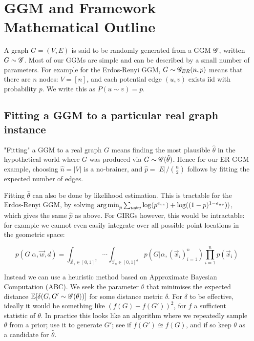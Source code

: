 

\section{GGM and Framework Mathematical Outline}
A graph $G = (V,E)$ is said to be randomly generated from a GGM $\mathscr{G}$, written $G \sim \mathscr{G}$. Most of our GGMs are simple and can be described by a small number of parameters. For example for the Erdos-Renyi GGM, $G \sim \mathscr{G}_{ER}(n, p)$ means that there are $n$ nodes: $V=[n]$, and each potential edge $(u,v)$ exists iid with probability $p$. We write this as $P(u \sim v) = p$.

\subsection{Fitting a GGM to a particular real graph instance}
\label{sec:fitting_GGM}
"Fitting" a GGM to a real graph $G$ means finding the most plausible $\hat{\theta}$ in the hypothetical world where $G$ was produced via $G \sim \mathscr{G}(\hat{\theta})$. Hence for our ER GGM example, choosing $\hat{n} = |V|$ is a no-brainer, and $\hat{p} = |E| / \binom{n}{2}$ follows by fitting the expected number of edges.

Fitting $\hat{\theta}$ can also be done by likelihood estimation. This is tractable for the Erdos-Renyi GGM, by solving $\operatorname*{arg\,min}_p \sum_{u \neq v} \log(p^{e_{uv}}) + \log((1-p)^{1 - e_{uv}}))$, which gives the same $\hat{p}$ as above. For GIRGs however, this would be intractable: for example we cannot even easily integrate over all possible point locations in the geometric space:

\begin{equation*}
    p(G | \alpha, \vec{w}, d) = \int_{\vec{x}_1 \in [0,1]^d} \cdots \int_{\vec{x}_n \in [0,1]^d} p(G | \alpha, (\vec{x}_i)_{i=1}^n) \prod_{i=1}^n p(\vec{x}_i)
\end{equation*}

Instead we can use a heuristic method based on Approximate Bayesian Computation (ABC). We seek the parameter $\hat{\theta}$ that minimises the expected distance $ \mathbb{E}[\delta(G, G' \sim \mathscr{G}(\theta))]$ for some distance metric $\delta$. For $\delta$ to be effective, ideally it would be something like $(f(G) - f(G'))^2$, for $f$ a sufficient statistic of $\theta$. In practice this looks like an algorithm where we repeatedly sample $\theta$ from a prior; use it to generate $G'$; see if $f(G') \approxeq f(G)$, and if so keep $\theta$ as a candidate for $\hat{\theta}$.

